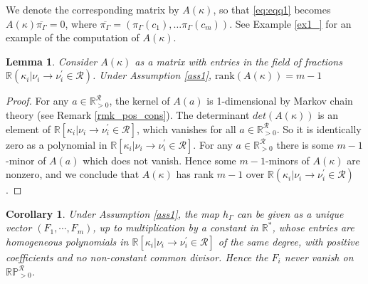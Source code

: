 \documentclass{amsart}
\newtheorem{lemma}[theorem]{Lemma}
\newtheorem{corollary}[theorem]{Corollary}
\theoremstyle{definition}
\theoremstyle{remark}
\theoremstyle{Conjecture/open problem}
\theoremstyle{assumption}
\theoremstyle{conjecture}
\def\Pr{\mathbb{P}}
\def\Ga{\Gamma}
\def\p{^{\prime}}
\def\k{\kappa}
\def\cR{\mathcal{R}}
\def\R{\mathbb{R}}
\numberwithin{equation}{section}
\begin{document}
We denote the corresponding matrix by $A(\k)$, so that \eqref{eq:eqq1} becomes $A(\k)\overline{\pi_{\Gamma}}=0$, where $\overline{\pi_{\Gamma}}=(\pi_\Ga(c_1),\ldots \pi_\Ga(c_m))$. See Example \ref{ex1_} for an example of the computation of $A(\k)$.
 \begin{lemma}\label{clm}  Consider $A(\k)$ as a matrix with entries in the field of fractions $\R(\k_i|{\nu_i\to\nu_i\p}\in\cR)$. Under Assumption \ref{ass1}, $\mathrm{rank}(A(\k))=m-1$\end{lemma}
\begin{proof} For any $a\in \R^\cR_{> 0}$, the kernel of $A(a)$ is 1-dimensional by Markov chain theory (see Remark \ref{rmk_pos_cons}). The determinant $det(A(\k))$ is an element of $\R[\k_i|{\nu_i\to\nu_i\p}\in\cR]$,  which vanishes for all $a\in \R^\cR_{> 0}$. So it is identically zero as a polynomial in $\R[\k_i|{\nu_i\to\nu_i\p}\in\cR]$.\hfill\break
For any $a\in \R^\cR_{> 0}$ there is some $m-1$-minor of $A(a)$ which does not vanish. Hence some $m-1$-minors of $A(\k)$ are nonzero,
and we conclude that $A(\k)$ has rank $m-1$ over $\R(\k_i|{\nu_i\to\nu_i\p}\in\cR)$.
\end{proof}



\begin{corollary}\label{clm2}
Under Assumption \ref{ass1}, the map $h_\Ga$ can be given as a unique vector $(F_1,\cdots , F_m)$, up to multiplication by a constant in $\R^*$, whose entries are homogeneous polynomials in $\R[\k_i|{\nu_i\to\nu_i\p}\in\cR]$ of the same degree, with positive coefficients and no non-constant common divisor.  Hence the $F_i$ never vanish on $\R\Pr_{>0}^\cR$. 
\end{corollary}
\end{document}
